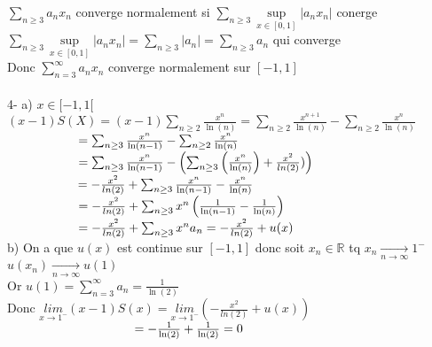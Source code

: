 \documentclass{article}
\newcommand\tab[1][1cm]{\hspace*{#1}}
\newcommand{\mylim}[2]{\underset{#1 \rightarrow #2}{\longrightarrow}}
\newcommand{\mysupp}[1]{\underset{x \in #1}{\sup}}
\begin{document}
$\sum_{n \geq 3} a_n x_n$ converge normalement si $\sum_{n \geq 3} \mysupp{[0, 1]} |a_n x_n|$ conerge\\
$\sum_{n \geq 3} \mysupp{[0, 1]} |a_n x_n| = \sum_{n \geq 3} |a_n| = \sum_{n \geq 3} a_n$ qui converge\\
Donc $\sum_{n = 3}^\infty a_n x_n$ converge normalement sur $[-1, 1]$\\
\\
4- a) $x \in [-1, 1[$\\
$(x - 1)S(X) = (x - 1)\sum_{n \geq 2} \frac{x^n}{\ln(n)} = \sum_{n \geq 2} \frac{x^{n + 1}}{\ln(n)} - \sum_{n \geq 2} \frac{x^n}{\ln(n)}$\\
$\tab[2cm] =\sum_{n \geq 3} \frac{x^{n}}{\ln(n - 1)} - \sum_{n \geq 2} \frac{x^n}{\ln(n)}$\\
$\tab[2cm] =\sum_{n \geq 3} \frac{x^{n}}{\ln(n - 1)} - \left(\sum_{n \geq 3} \left(\frac{x^n}{\ln(n)}\right) + \frac{x^2}{ln(2)})\right)$\\
$\tab[2cm] =-\frac{x^2}{ln(2)} + \sum_{n \geq 3} \frac{x^{n}}{\ln(n - 1)} - \frac{x^{n}}{\ln(n)}$\\
$\tab[2cm] =-\frac{x^2}{ln(2)} + \sum_{n \geq 3} x^n \left(\frac{1}{\ln(n - 1)} - \frac{1}{\ln(n)}\right)$\\
$\tab[2cm] =-\frac{x^2}{ln(2)} + \sum_{n \geq 3} x^n a_n = -\frac{x^2}{ln(2)} + u(x)$\\
b) On a que $u(x)$ est continue sur $[-1 , 1]$ donc soit $x_n \in \mathbb{R}$ tq $x_n \mylim{n}{\infty} 1^-$\\
$u(x_n) \mylim{n}{\infty} u(1)$\\
Or $u(1) = \sum_{n = 3}^\infty a_n = \frac{1}{\ln(2)}$\\
Donc $\underset{x \rightarrow 1^-}{lim} (x - 1)S(x) = \underset{x \rightarrow 1^-}{lim} \left(-\frac{x^2}{ln(2)} + u(x)\right)$\\
$\tab[3.6cm] = -\frac{1}{\ln(2)} + \frac{1}{\ln(2)} = 0$ 
\end{document}
